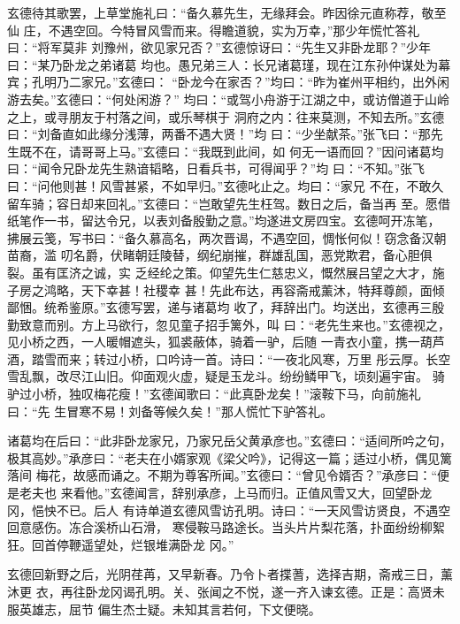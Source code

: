 玄德待其歌罢，上草堂施礼曰：“备久慕先生，无缘拜会。昨因徐元直称荐，敬至仙
庄，不遇空回。今特冒风雪而来。得瞻道貌，实为万幸，”那少年慌忙答礼曰：“将军莫非
刘豫州，欲见家兄否？”玄德惊讶曰：“先生又非卧龙耶？”少年曰：“某乃卧龙之弟诸葛
均也。愚兄弟三人：长兄诸葛瑾，现在江东孙仲谋处为幕宾；孔明乃二家兄。”玄德曰：
“卧龙今在家否？”均曰：“昨为崔州平相约，出外闲游去矣。”玄德曰：“何处闲游？”
均曰：“或驾小舟游于江湖之中，或访僧道于山岭之上，或寻朋友于村落之间，或乐琴棋于
洞府之内：往来莫测，不知去所。”玄德曰：“刘备直如此缘分浅薄，两番不遇大贤！”均
曰：“少坐献茶。”张飞曰：“那先生既不在，请哥哥上马。”玄德曰：“我既到此间，如
何无一语而回？”因问诸葛均曰：“闻令兄卧龙先生熟谙韬略，日看兵书，可得闻乎？”均
曰：“不知。”张飞曰：“问他则甚！风雪甚紧，不如早归。”玄德叱止之。均曰：“家兄
不在，不敢久留车骑；容日却来回礼。”玄德曰：“岂敢望先生枉驾。数日之后，备当再
至。愿借纸笔作一书，留达令兄，以表刘备殷勤之意。”均遂进文房四宝。玄德呵开冻笔，
拂展云笺，写书曰：“备久慕高名，两次晋谒，不遇空回，惆怅何似！窃念备汉朝苗裔，滥
叨名爵，伏睹朝廷陵替，纲纪崩摧，群雄乱国，恶党欺君，备心胆俱裂。虽有匡济之诚，实
乏经纶之策。仰望先生仁慈忠义，慨然展吕望之大才，施子房之鸿略，天下幸甚！社稷幸
甚！先此布达，再容斋戒薰沐，特拜尊颜，面倾鄙悃。统希鉴原。”玄德写罢，递与诸葛均
收了，拜辞出门。均送出，玄德再三殷勤致意而别。方上马欲行，忽见童子招手篱外，叫
曰：“老先生来也。”玄德视之，见小桥之西，一人暖帽遮头，狐裘蔽体，骑着一驴，后随
一青衣小童，携一葫芦酒，踏雪而来；转过小桥，口吟诗一首。诗曰：“一夜北风寒，万里
彤云厚。长空雪乱飘，改尽江山旧。仰面观火虚，疑是玉龙斗。纷纷鳞甲飞，顷刻遍宇宙。
骑驴过小桥，独叹梅花瘦！”玄德闻歌曰：“此真卧龙矣！”滚鞍下马，向前施礼曰：“先
生冒寒不易！刘备等候久矣！”那人慌忙下驴答礼。

诸葛均在后曰：“此非卧龙家兄，乃家兄岳父黄承彦也。”玄德曰：“适间所吟之句，
极其高妙。”承彦曰：“老夫在小婿家观《梁父吟》，记得这一篇；适过小桥，偶见篱落间
梅花，故感而诵之。不期为尊客所闻。”玄德曰：“曾见令婿否？”承彦曰：“便是老夫也
来看他。”玄德闻言，辞别承彦，上马而归。正值风雪又大，回望卧龙冈，悒怏不已。后人
有诗单道玄德风雪访孔明。诗曰：“一天风雪访贤良，不遇空回意感伤。冻合溪桥山石滑，
寒侵鞍马路途长。当头片片梨花落，扑面纷纷柳絮狂。回首停鞭遥望处，烂银堆满卧龙
冈。”

玄德回新野之后，光阴荏苒，又早新春。乃令卜者揲蓍，选择吉期，斋戒三日，薰沐更
衣，再往卧龙冈谒孔明。关、张闻之不悦，遂一齐入谏玄德。正是：高贤未服英雄志，屈节
偏生杰士疑。未知其言若何，下文便晓。
